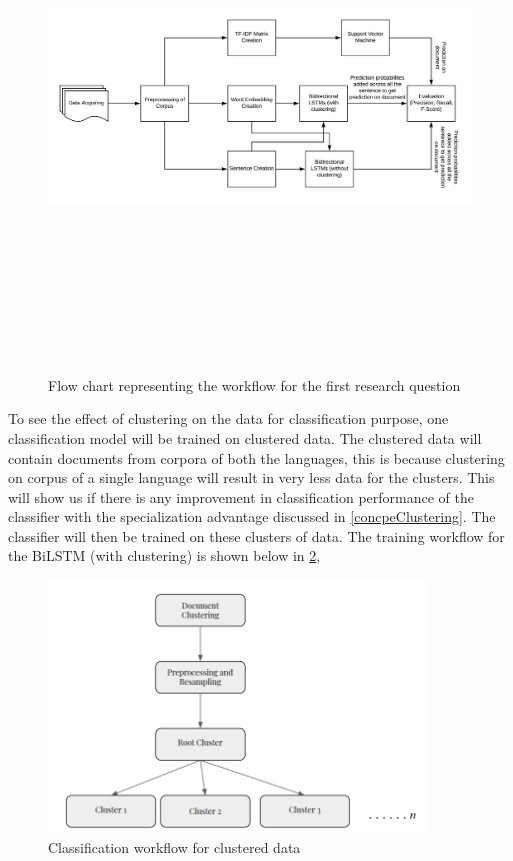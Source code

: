 \begin{figure}[!ht]
    \centering
    \includegraphics[width=15cm, height=14cm,keepaspectratio]{pics/flowforQuestion1.jpeg}
    \caption{Flow chart representing the workflow for the first research question }
    \label{fig:FlowResearchQuestion1}
\end{figure}

To see the effect of clustering on the data for classification purpose, one classification model will be trained on clustered data. The clustered data will contain documents from corpora of both the languages, this is because clustering on corpus of a single language will result in very less data for the clusters. This will show us if there is any improvement in classification performance of the classifier with the specialization advantage discussed in \ref{concpeClustering}. The classifier will then be trained on these clusters of data. The training workflow for the \gls{BiLSTM} (with clustering) is shown below in \ref{fig:clusterFlowClassification}, 

\begin{figure}[!ht]
    \centering
    \includegraphics[width=10cm,keepaspectratio]{pics/approach_cls.png}
    \caption{Classification workflow for clustered data}
    \label{fig:clusterFlowClassification}
\end{figure}


